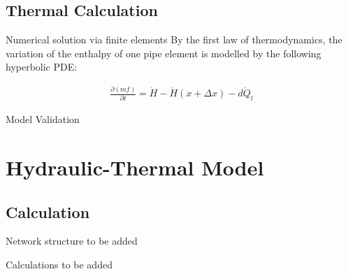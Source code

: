 \documentclass[xcolor=dvipsnames]{beamer}
\begin{document}
\subsection{Thermal Calculation}

\begin{frame}{Numerical solution via finite elements}
	By the first law of thermodynamics, the variation of the enthalpy of one pipe element is modelled by the
	following hyperbolic PDE:

	\begin{align}
		\frac{\partial(mf)}{\partial t}=\dot{H}-\dot{H}(x+\Delta x)-d\dot{Q}_l
	\end{align}
\end{frame}

\begin{frame}{Model Validation}
	
\end{frame}

\section{Hydraulic-Thermal Model}

\subsection{Calculation}

\begin{frame}{Network structure}
	to be added
\end{frame}

\begin{frame}{Calculations}
		to be added
\end{frame}
\end{document}
